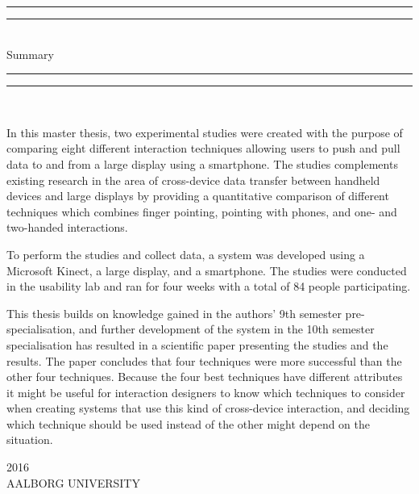 \begin{dummy}

	\textheight
	\centering
	\vspace*{\baselineskip}
	\rule{\textwidth}{2pt}\vspace*{-\baselineskip}\vspace*{2pt}
	\rule{\textwidth}{0.4pt}\\[\baselineskip]
	{\LARGE Summary}\\[0.2\baselineskip]
	\rule{\textwidth}{0.4pt}\vspace*{-\baselineskip}\vspace{3.2pt}
	\rule{\textwidth}{2pt}\\[\baselineskip]
	\scshape
	{} \par
	\vspace*{2\baselineskip}
	\vspace*{2\baselineskip}

\begin{summary}
In this master thesis, two experimental studies were created with the purpose of comparing eight different interaction techniques allowing users to push and pull data to and from a large display using a smartphone.
The studies complements existing research in the area of cross-device data transfer between handheld devices and large displays by providing a quantitative comparison of different techniques which combines finger pointing, pointing with phones, and one- and two-handed interactions.

To perform the studies and collect data, a system was developed using a Microsoft Kinect, a large display, and a smartphone.
The studies were conducted in the usability lab and ran for four weeks with a total of 84 people participating. 

This thesis builds on knowledge gained in the authors' 9th semester pre-specialisation, and further development of the system in the 10th semester specialisation has resulted in a scientific paper presenting the studies and the results.
The paper concludes that four techniques were more successful than the other four techniques.
Because the four best techniques have different attributes it might be useful for interaction designers to know which techniques to consider when creating systems that use this kind of cross-device interaction, and deciding which technique should be used instead of the other might depend on the situation.
\end{summary}
	\vspace*{2\baselineskip}
		{\scshape 2016} \\
		{\large AALBORG UNIVERSITY}\par
	
\end{dummy}